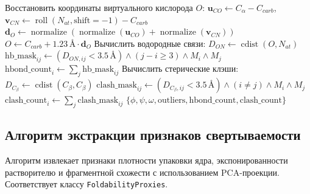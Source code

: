 \documentclass[12pt, a4paper]{article}
\begin{document}
\begin{algorithm}[h]
\begin{algorithmic}[1]
\State Восстановить координаты виртуального кислорода $O$:
\State \quad $\mathbf{u}_{CO} \gets C_\alpha - C_{carb}$, $\mathbf{v}_{CN} \gets \operatorname{roll}(N_{at}, \text{shift}=-1) - C_{carb}$
\State \quad $\mathbf{d}_O \gets \operatorname{normalize}\left(\operatorname{normalize}(\mathbf{u}_{CO}) + \operatorname{normalize}(\mathbf{v}_{CN})\right)$
\State \quad $O \gets C_{carb} + 1.23\,\text{\AA} \cdot \mathbf{d}_O$
\State Вычислить водородные связи:
\State \quad $D_{ON} \gets \operatorname{cdist}(O, N_{at})$
\State \quad $\text{hb\_mask}_{ij} \gets (D_{ON, ij} < 3.5\,\text{\AA}) \land (j - i \ge 3) \land M_i \land M_j$
\State \quad $\text{hbond\_count}_i \gets \sum_{j} \text{hb\_mask}_{ij}$
\State Вычислить стерические клэши:
\State \quad $D_{C_\beta} \gets \operatorname{cdist}(C_\beta, C_\beta)$
\State \quad $\text{clash\_mask}_{ij} \gets (D_{C_\beta, ij} < 3.5\,\text{\AA}) \land (i \neq j) \land M_i \land M_j$
\State \quad $\text{clash\_count}_i \gets \sum_{j} \text{clash\_mask}_{ij}$
\State \Return $\{\phi, \psi, \omega, \text{outliers}, \text{hbond\_count}, \text{clash\_count}\}$
\end{algorithmic}
\end{algorithm}

\newpage

\subsection{Алгоритм экстракции признаков свертываемости}
Алгоритм извлекает признаки плотности упаковки ядра, экспонированности растворителю и фрагментной схожести с использованием PCA-проекции. Соответствует классу \texttt{Foldability}\-\texttt{Proxies}.
\end{document}

